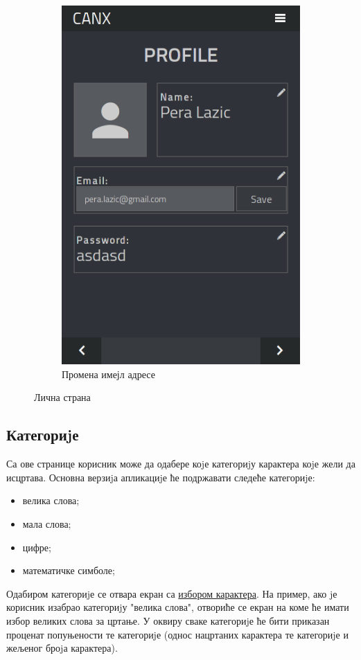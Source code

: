 \documentclass[a4paper]{article}
\begin{document}
\begin{figure}
\begin{subfigure}{.5\textwidth}
  \includegraphics[width=.9\linewidth]{profile-edit}
  \caption{Промена имејл адресе}
  \label{fig:sub2}
\end{subfigure}
\caption{Лична страна}
\label{fig:test}
\end{figure}


\subsection{Категориjе}
\label{categories}
Са ове странице корисник може да одабере коjе категориjу карактера
коjе жели да исцртава. Основна верзиjа апликациjе ће подржавати следеће
категориjе:
\begin{itemize}
	\item велика слова;
	\item мала слова;
	\item цифре;
	\item математичке симболе;
\end{itemize}
Одабиром категориjе се отвара екран са \hyperref[character]{избором карактера}. На пример,
ако jе корисник изабрао категориjу "велика слова", отвориће се екран на
коме ће имати избор великих слова за цртање. У оквиру сваке категориjе
ће бити приказан проценат попуњености те категориjе (однос нацртаних
карактера те категориjе и жељеног броjа карактера).
\end{document}
